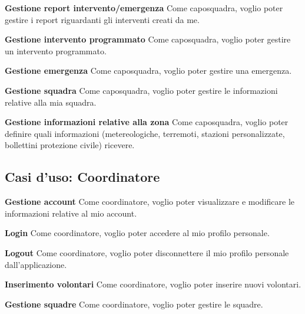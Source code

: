 \textbf{Gestione report intervento/emergenza}
Come caposquadra, voglio poter gestire i report riguardanti gli interventi creati da me.

\textbf{Gestione intervento programmato}
Come caposquadra, voglio poter gestire un intervento programmato.

\textbf{Gestione emergenza}
Come caposquadra, voglio poter gestire una emergenza.

\textbf{Gestione squadra}
Come caposquadra, voglio poter gestire le informazioni relative alla mia squadra.

\textbf{Gestione informazioni relative alla zona}
Come caposquadra, voglio poter definire quali informazioni (metereologiche, terremoti, stazioni personalizzate, bollettini protezione civile) ricevere.


\subsection{Casi d'uso: Coordinatore}

\textbf{Gestione account}
Come coordinatore, voglio poter visualizzare e modificare le informazioni relative al mio account.

\textbf{Login}
Come coordinatore, voglio poter accedere al mio profilo personale.

\textbf{Logout}
Come coordinatore, voglio poter disconnettere il mio profilo personale dall'applicazione.

\textbf{Inserimento volontari}
Come coordinatore, voglio poter inserire nuovi volontari.

\textbf{Gestione squadre}
Come coordinatore, voglio poter gestire le squadre.


